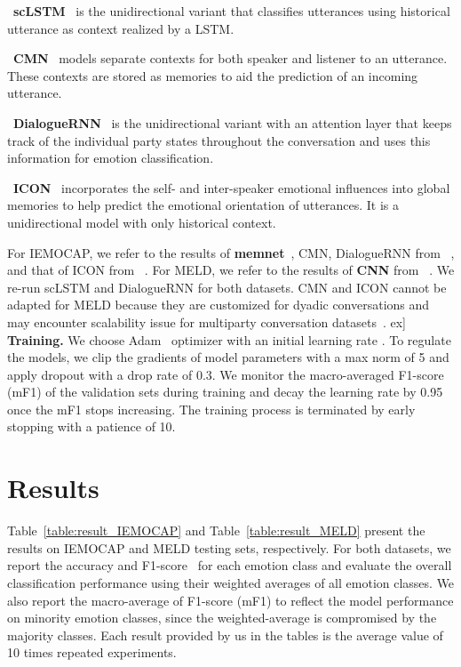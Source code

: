 \documentclass[letterpaper]{article} \usepackage{aaai20}  \usepackage{times}  \usepackage{helvet} \usepackage{courier}  \usepackage[hyphens]{url}  \usepackage{graphicx} \urlstyle{rm} \def\UrlFont{\rm}  \usepackage{graphicx}  \frenchspacing  \setlength{\pdfpagewidth}{8.5in}  \setlength{\pdfpageheight}{11in}
\begin{document}
~\textbf{scLSTM}~\cite{DBLP:conf/acl/PoriaCHMZM17} is the unidirectional variant that classifies utterances using historical utterance as context realized by a LSTM.

~\textbf{CMN}~\cite{DBLP:conf/naacl/HazarikaPZCMZ18} models separate contexts for both speaker and listener to an utterance. These contexts are stored as memories to aid the prediction of an incoming utterance.

~\textbf{DialogueRNN}~\cite{DBLP:conf/aaai/MajumderPHMGC19} is the unidirectional variant with an attention layer that keeps track of the individual party states throughout the conversation and uses this information for emotion classification.

~\textbf{ICON}~\cite{DBLP:conf/emnlp/HazarikaPMCZ18} incorporates the self- and inter-speaker emotional influences into global memories to help predict the emotional orientation of utterances. It is a unidirectional model with only historical context.

For IEMOCAP, we refer to the results of \textbf{memnet}~\cite{DBLP:conf/nips/SukhbaatarSWF15}, CMN, DialogueRNN from ~\cite{DBLP:conf/aaai/MajumderPHMGC19}, and that of ICON from ~\cite{DBLP:conf/emnlp/HazarikaPMCZ18}. For MELD, we refer to the results of \textbf{CNN} from ~\cite{DBLP:journals/access/PoriaMMH19}. We re-run scLSTM and DialogueRNN for both datasets.
CMN and ICON cannot be adapted for MELD because they are customized for dyadic conversations and may encounter scalability issue for multiparty conversation datasets~\cite{DBLP:journals/access/PoriaMMH19}. 
\1ex]
\noindent\textbf{Training.}
We choose Adam~\cite{DBLP:journals/corr/KingmaB14} optimizer with an initial learning rate . To regulate the models, we clip the gradients of model parameters with a max norm of 5 and apply dropout with a drop rate of 0.3. We monitor the macro-averaged F1-score (mF1) of the validation sets during training and decay the learning rate by 0.95 once the mF1 stops increasing. The training process is terminated by early stopping with a patience of 10.


\section{Results}

Table~\ref{table:result_IEMOCAP} and Table~\ref{table:result_MELD} present the results on IEMOCAP and MELD testing sets, respectively. For both datasets, we report the accuracy and F1-score~\cite{DBLP:conf/acl/TongZJM17} for each emotion class and evaluate the overall classification performance using their weighted averages of all emotion classes. We also report the macro-average of F1-score (mF1) to reflect the model performance on minority emotion classes, since the weighted-average is compromised by the majority classes. Each result provided by us in the tables is the average value of 10 times repeated experiments.
\end{document}
